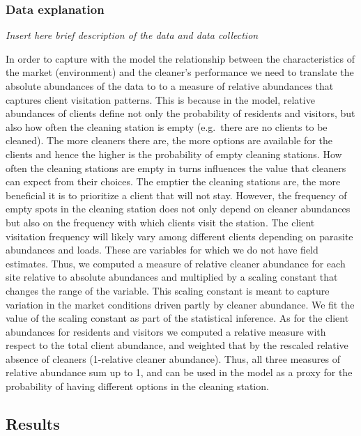 \documentclass[]{rsos}%
\begin{document}
\hypertarget{data-explanation}{%
\subsubsection{Data explanation}\label{data-explanation}}

\emph{Insert here brief description of the data and data collection}

In order to capture with the model the relationship between the
characteristics of the market (environment) and the cleaner's
performance we need to translate the absolute abundances of the data to
to a measure of relative abundances that captures client visitation patterns.
This is because in the model, relative abundances
of clients define not only the probability of residents and visitors,
but also how often the cleaning station is empty (e.g.~there are no
clients to be cleaned). The more cleaners there are, the more options
are available for the clients and hence the higher is the probability of
empty cleaning stations. How often the cleaning stations are empty in
turns influences the value that cleaners can expect from their choices.
The emptier the cleaning stations are, the more beneficial it is to
prioritize a client that will not stay. However, the frequency of empty
spots in the cleaning station does not only depend on cleaner abundances
but also on the frequency with which clients visit the
station. The client visitation frequency will likely vary among
different clients depending on parasite abundances and loads. These are
variables for which we do not have field estimates. Thus, we computed a
measure of relative cleaner abundance for each site relative to absolute
abundances and multiplied by a scaling constant that changes the range
of the variable. This scaling constant is meant to capture variation in the market
conditions driven partly by cleaner abundance. We fit the value of the
scaling constant as part of the
statistical inference. As for the client abundances for residents and
visitors we computed a relative measure with respect to the total client
abundance, and weighted that by the rescaled relative absence of
cleaners (1-relative cleaner abundance). Thus, all three measures of
relative abundance sum up to 1, and can be used in the model as a proxy
for the probability of having different options in the cleaning station.

\hypertarget{results}{%
\subsection{Results}\label{results}}
\end{document}
